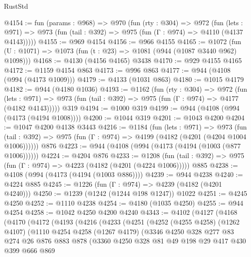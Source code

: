 \begin{lexlean}{RustStd}
\begin{coremodule}
{\begin{coremodule}
{{{{{{{{{{@4154 := fun (params : @968) =>
  @970
    (fun (rty : @304) =>
    @972
      (fun (lets : @971) =>
      @973 (fun (tail : @392) => @975 (fun (Γ : @974) => @4110 (@4137 @4143)))))
@4155 := @969 @4154
@4156 := @966 @4155
@4165 := @1072 (fun (U : @1071) => @1073 (fun (t : @23) => @1081 (@944 (@1087 @3440 @962) @1098)))
@4168 := @4130 (@4156 @4165) @3438
@4170 := @929 @4155 @4165
@4172 := @1159 @4154 @863
@4173 := @996 @863
@4177 := @944 (@4108 (@994 (@4173 @1009)))
@4179 := @4133 (@1031 @863)
@4180 := @1015 @4179
@4182 := @944 (@4180 @1036)
@4193 := @1162
    (fun (rty : @304) =>
    @972
      (fun (lets : @971) =>
      @973 (fun (tail : @392) => @975 (fun (Γ : @974) => @4177 (@4182 @4143)))))
    @319
@4194 := @1000 @319
@4199 := @944 (@4108 (@994 (@4173 (@4194 @1008))))
@4200 := @1044 @319
@4201 := @1043 @4200
@4204 := @1047 @4200 @4138 @3443
@4216 := @1184
    (fun (lets : @971) =>
    @973 (fun (tail : @392) => @975 (fun (Γ : @974) => @4199 (@4182 (@4201 (@4204 @1004 @1006))))))
    @876
@4223 := @944 (@4108 (@994 (@4173 (@4194 (@1003 (@877 @1006))))))
@4224 := @4204 @876
@4233 := @1208
    (fun (tail : @392) => @975 (fun (Γ : @974) => @4223 (@4182 (@4201 (@4224 @1006)))))
    @885
@4238 := @4108 (@994 (@4173 (@4194 (@1003 @886))))
@4239 := @944 @4238
@4240 := @4224 @885
@4245 := @1226 (fun (Γ : @974) => @4239 (@4182 (@4201 @4240)))
@4250 := @1239 (@1242 (@1244 @198 @1247)) @1022
@4251 := @4245 @4250
@4252 := @1110 @4238
@4254 := @4180 (@1035 @4250)
@4255 := @944 @4254
@4258 := @1042 @4250 @4200 @4240
@4343 := @4102
    (@4127
      (@4168
        (@4170
          (@4172
            (@4193
              (@4216
                (@4233
                  (@4251
                    (@4252
                      (@4255 @4258)
                      (@1262 @4107)
                      (@1110
                        @4254
                        @4258
                        (@1267 @4179)
                        (@3346
                          @4250
                          @328
                          @277
                          @83
                          @274
                          @26
                          @876
                          @883
                          @878
                          (@3360
                            @4250
                            @328
                            @81
                            @49
                            @198
                            @29
                            @417
                            @430
                            @399
                            @666
                            @869
}}}}}}}}}}
\end{coremodule}}
\end{coremodule}
\end{lexlean}
